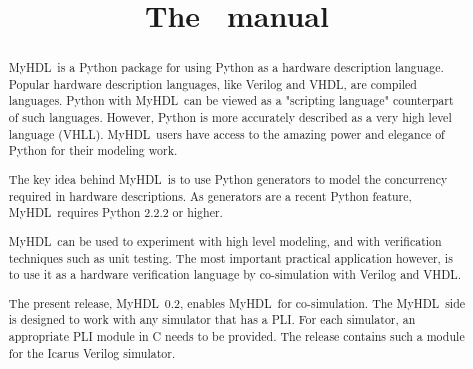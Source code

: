 \documentclass{manual}
\title{The \myhdl\ manual}
\newcommand{\myhdl}{\protect \mbox{MyHDL}}
\begin{document}
\maketitle



\begin{abstract}

\noindent

\myhdl\ is a Python package for using Python as a hardware description
language. Popular hardware description languages, like Verilog and
VHDL, are compiled languages. Python with \myhdl\ can be viewed as a
"scripting language" counterpart of such languages. However, Python is
more accurately described as a very high level language
(VHLL). \myhdl\ users have access to the amazing power and elegance of
Python for their modeling work.

The key idea behind \myhdl\ is to use Python generators to model the
concurrency required in hardware descriptions. As generators are a
recent Python feature, \myhdl\ requires Python 2.2.2 or higher.

\myhdl\ can be used to experiment with high level modeling, and with
verification techniques such as unit testing. The most important
practical application however, is to use it as a hardware verification
language by co-simulation with Verilog and VHDL.

The present release, \myhdl\ 0.2, enables \myhdl\ for
co-simulation. The \myhdl\ side is designed to work with any simulator
that has a PLI. For each simulator, an appropriate PLI module in C
needs to be provided. The release contains such a module for the
Icarus Verilog simulator.


\end{abstract}

\tableofcontents









\end{document}
